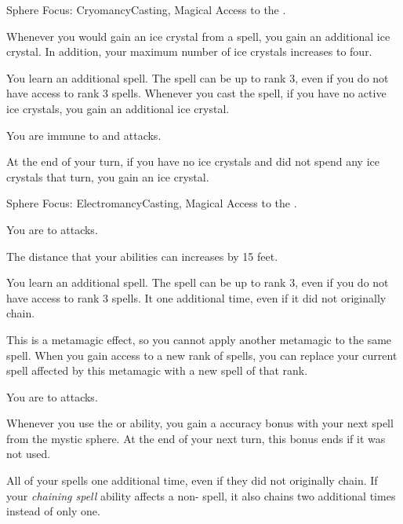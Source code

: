   \begin{magicalfeat}{Sphere Focus: Cryomancy}{Casting, Magical}
    \featpre Access to the  .

     Whenever you would gain an ice crystal from a  spell, you gain an additional ice crystal.
    In addition, your maximum number of ice crystals increases to four.

     You learn an additional spell.
    The spell can be up to rank 3, even if you do not have access to rank 3 spells.
    Whenever you cast the spell, if you have no active ice crystals, you gain an additional ice crystal.

     You are immune to \atCold and \atPoison attacks.

     At the end of your turn, if you have no ice crystals and did not spend any ice crystals that turn, you gain an ice crystal.
  \end{magicalfeat}

  \begin{magicalfeat}{Sphere Focus: Electromancy}{Casting, Magical}
    \featpre Access to the  .

     You are \resistant to \atElectricity attacks.

     The distance that your abilities can  increases by 15 feet.

     You learn an additional  spell.
    The spell can be up to rank 3, even if you do not have access to rank 3 spells.
    It  one additional time, even if it did not originally chain.

    This is a metamagic effect, so you cannot apply another metamagic to the same spell.
    When you gain access to a new rank of spells, you can replace your current spell affected by this metamagic with a new spell of that rank.

     You are  to \atElectricity attacks.

     Whenever you use the  or  ability, you gain a  accuracy bonus with your next spell from the  mystic sphere.
    At the end of your next turn, this bonus ends if it was not used.

     All of your   spells  one additional time, even if they did not originally chain.
    If your \textit{chaining spell} ability affects a non- spell, it also chains two additional times instead of only one.
  \end{magicalfeat}

